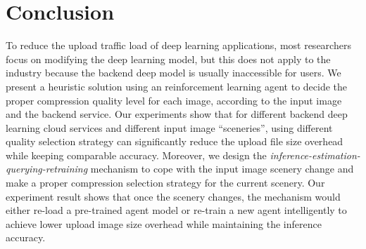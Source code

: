 \section{Conclusion}
\label{sec: conclusion}

To reduce the upload traffic load of deep learning applications, most researchers focus on modifying the deep learning model, but this does not apply to the industry because the backend deep model is usually inaccessible for users. We present a heuristic solution using an reinforcement learning agent to decide the proper compression quality level for each image, according to the input image and the backend service. Our experiments show that for different backend deep learning cloud services and different input image ``sceneries'', using different quality selection strategy can significantly reduce the upload file size overhead while keeping comparable accuracy. Moreover, we design the \emph{inference-estimation-querying-retraining} mechanism to cope with the input image scenery change and make a proper compression selection strategy for the current scenery. Our experiment result shows that once the scenery changes, the mechanism would either re-load a pre-trained agent model or re-train a new
agent intelligently to achieve lower upload image size overhead while maintaining the inference accuracy.

